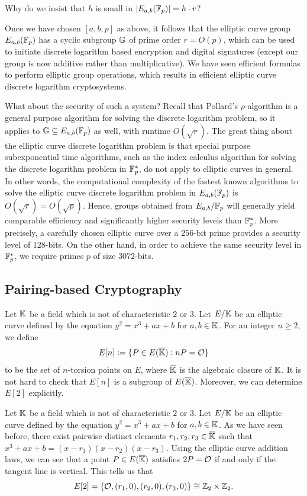 \begin{exercise}
    Why do we insist that $h$ is small in $|E_{a,b}(\mathbb{F}_p)| = h \cdot r$? 
\end{exercise}

Once we have chosen $[a, b, p]$ as above, it follows that the elliptic curve 
group $E_{a,b}(\mathbb{F}_p)$ has a cyclic subgroup $\mathbb{G}$ of prime order $r = O(p)$, 
which can be used to initiate discrete logarithm based encryption and digital
signatures (except our group is now additive rather than multiplicative). 
We have seen efficient formulas to perform elliptic group operations, which 
results in efficient elliptic curve discrete logarithm cryptosystems. 

What about the security of such a system? Recall that Pollard's $\rho$-algorithm 
is a general purpose algorithm for solving the discrete logarithm problem, 
so it applies to $\mathbb{G} \subseteq E_{a,b}(\mathbb{F}_p)$ as well, with runtime $O(\sqrt r)$. 
The great thing about the elliptic curve discrete logarithm problem is that 
special purpose subexponential time algorithms, such as the index calculus 
algorithm for solving the discrete logarithm problem in $\mathbb{F}_p^*$, do 
not apply to elliptic curves in general. In other words, the computational 
complexity of the fastest known algorithms to solve the elliptic curve 
discrete logarithm problem in $E_{a,b}(\mathbb{F}_p)$ is $O(\sqrt r) = O(\sqrt p)$. 
Hence, groups obtained from $E_{a,b}/\mathbb{F}_p$ will generally yield comparable 
efficiency and significantly higher security levels than $\mathbb{F}_p^*$. 
More precisely, a carefully chosen elliptic curve over a $256$-bit prime 
provides a security level of $128$-bits. On the other hand, in order to 
achieve the same security level in $\mathbb{F}_p^*$, we require primes $p$ of 
size $3072$-bits. 

\subsection{Pairing-based Cryptography}
Let $\mathbb{K}$ be a field which is not of characteristic $2$ or $3$. Let 
$E/\mathbb{K}$ be an elliptic curve defined by the equation $y^2 = x^3 + ax + b$ 
for $a, b \in \mathbb{K}$. For an integer $n \geq 2$, we define 
\[ E[n] := \{P \in E(\overline{\mathbb{K}}) : nP = {\cal O}\} \] 
to be the set of $n$-torsion points on $E$, where $\overline{\mathbb{K}}$ is the 
algebraic closure of $\mathbb{K}$. It is not hard to check that $E[n]$ is a subgroup of 
$E(\overline{\mathbb{K}})$. Moreover, we can determine $E[2]$ explicitly. 

\begin{exmp}
    Let $\mathbb{K}$ be a field which is not of characteristic $2$ or $3$. Let 
    $E/\mathbb{K}$ be an elliptic curve defined by the equation $y^2 = x^3 + ax + b$ 
    for $a, b \in \mathbb{K}$. As we have seen before, there exist pairwise 
    distinct elements $r_1, r_2, r_3 \in \overline{\mathbb{K}}$ such that 
    $x^3 + ax + b = (x - r_1)(x - r_2)(x - r_3)$. Using the elliptic curve 
    addition laws, we can see that a point $P \in E(\overline{\mathbb{K}})$ 
    satisfies $2P = {\cal O}$ if and only if the tangent line is vertical. 
    This tells us that 
    \[ E[2] = \{{\cal O}, (r_1, 0), (r_2, 0), (r_3, 0)\} \cong \mathbb{Z}_2 \times \mathbb{Z}_2. \] 
\end{exmp}

